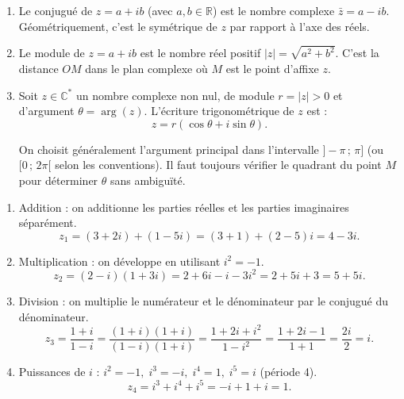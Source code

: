 \documentclass[11pt]{article}
\newcommand{\cle}[1]{{\popxbold\color{popdark}#1}}
\begin{document}
\begin{corrige}
\begin{enumerate}
\item Le \cle{conjugué} de $z = a + ib$ (avec $a, b \in \mathbb{R}$) est le nombre complexe $\bar{z} = a - ib$. Géométriquement, c'est le symétrique de $z$ par rapport à l'axe des réels.
\item Le \cle{module} de $z = a + ib$ est le nombre réel positif $|z| = \sqrt{a^2 + b^2}$. C'est la distance $OM$ dans le plan complexe où $M$ est le point d'affixe $z$.
\item Soit $z \in \mathbb{C}^*$ un nombre complexe non nul, de module $r = |z| > 0$ et d'argument $\theta = \arg(z)$. L'\cle{écriture trigonométrique} de $z$ est :
\[ z = r\left(\cos\theta + i\sin\theta\right). \]
  \begin{attention}
  On choisit généralement l'argument principal dans l'intervalle $]-\pi\,;\,\pi]$ (ou $[0\,;\,2\pi[$ selon les conventions). Il faut toujours vérifier le quadrant du point $M$ pour déterminer $\theta$ sans ambiguïté.
  \end{attention}
\end{enumerate}
\end{corrige}

\begin{corrige}
\begin{enumerate}
\item Addition : on additionne les parties réelles et les parties imaginaires séparément.
\[ z_1 = (3 + 2i) + (1 - 5i) = (3+1) + (2-5)i = 4 - 3i. \]
\item Multiplication : on développe en utilisant $i^2 = -1$.
\[ z_2 = (2 - i)(1 + 3i) = 2 + 6i - i - 3i^2 = 2 + 5i + 3 = 5 + 5i. \]
\item Division : on multiplie le numérateur et le dénominateur par le \cle{conjugué} du dénominateur.
\[ z_3 = \dfrac{1+i}{1-i} = \dfrac{(1+i)(1+i)}{(1-i)(1+i)} = \dfrac{1 + 2i + i^2}{1 - i^2} = \dfrac{1 + 2i - 1}{1 + 1} = \dfrac{2i}{2} = i. \]
\item Puissances de $i$ : $i^2=-1,\; i^3=-i,\; i^4=1,\; i^5=i$ (période 4).
\[ z_4 = i^3 + i^4 + i^5 = -i + 1 + i = 1. \]
\end{enumerate}
\end{corrige}
\end{document}

